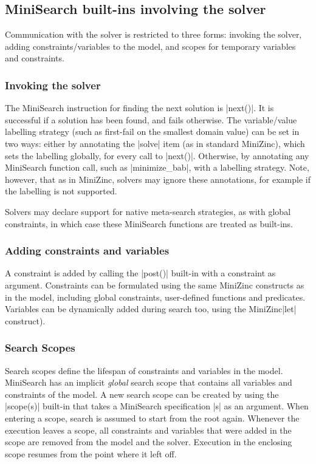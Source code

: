 \documentclass[a4paper,13pt,onecolumn]{article}%
\newcommand{\MiniZinc}{\mbox{\sc MiniZinc}\xspace}
\newcommand{\MiniSearch}{\mbox{\sc MiniSearch}\xspace}
\begin{document}
\subsection{\MiniSearch built-ins involving the solver}
Communication with the solver is restricted to three forms: invoking the solver, adding constraints/variables to the model, and scopes for temporary variables and constraints.

\subsubsection{Invoking the solver} 
The \MiniSearch instruction for finding the next solution is \mzninline|next()|. 
It is successful if a solution has been found, and fails otherwise. 
The variable/value labelling strategy (such as first-fail on the smallest domain value) can be set in two ways: either
by annotating the \mzninline|solve| item (as in standard \MiniZinc), which sets the labelling globally, for every call to \mzninline|next()|.
Otherwise, by annotating any \MiniSearch function call, such as \mzninline|minimize_bab|, with a labelling strategy. Note, however,
that as in \MiniZinc, solvers may ignore these annotations, for example if the labelling is not supported.

Solvers may declare support for native meta-search strategies, as with global constraints, in which case these \MiniSearch functions are treated as built-ins.


\subsubsection{Adding constraints and variables} 
A constraint is added by calling the \mzninline|post()| built-in with a constraint as argument. Constraints can be formulated using the same \MiniZinc constructs as in the model, including global constraints, user-defined functions and predicates.
Variables can be dynamically added during search too, using the \MiniZinc \mzninline|let| construct).

\subsubsection{Search Scopes} 
Search scopes define the lifespan of constraints and variables in the model. \MiniSearch has an implicit {\em global} search scope that contains all variables and constraints of the model. A new search scope can be created by using the \mzninline|scope(s)| built-in that takes a \MiniSearch specification \mzninline|s| as an argument. When entering a scope, search is assumed to start from the root again. Whenever the execution leaves a scope, all constraints and variables that were added in the scope are removed from the model and the solver. Execution in the enclosing scope resumes from the point where it left off.
\end{document}
